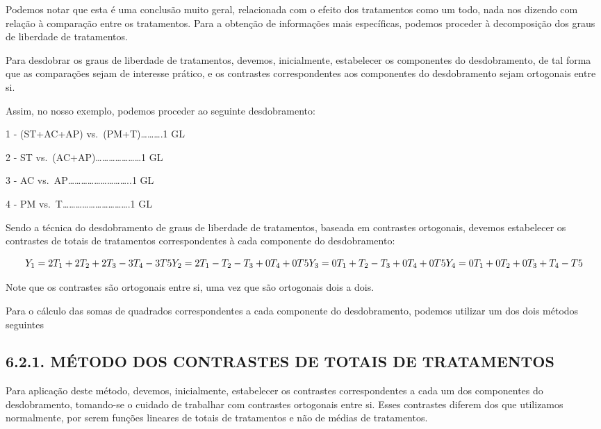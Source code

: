 \documentclass[
]{book}
\begin{document}
Podemos notar que esta é uma conclusão muito geral, relacionada com o efeito dos tratamentos como um todo, nada nos dizendo com relação à comparação entre os tratamentos. Para a obtenção de informações mais específicas, podemos proceder à decomposição dos graus de liberdade de tratamentos.

Para desdobrar os graus de liberdade de tratamentos, devemos, inicialmente, estabelecer os componentes do desdobramento, de tal forma que as comparações sejam de interesse prático, e os contrastes correspondentes aos componentes do desdobramento sejam ortogonais entre si.

Assim, no nosso exemplo, podemos proceder ao seguinte desdobramento:

1 - (ST+AC+AP) vs.~(PM+T)\ldots\ldots\ldots.1 GL

2 - ST vs.~(AC+AP)\ldots\ldots\ldots\ldots\ldots\ldots\ldots1 GL

3 - AC vs.~AP\ldots\ldots\ldots\ldots\ldots\ldots\ldots\ldots\ldots..1 GL

4 - PM vs.~T\ldots\ldots\ldots\ldots\ldots\ldots\ldots\ldots\ldots\ldots.1 GL

Sendo a técnica do desdobramento de graus de liberdade de tratamentos, baseada em contrastes ortogonais, devemos estabelecer os contrastes de totais de tratamentos correspondentes à cada componente do desdobramento:

\[
Y_1 = 2T_1+2T_2+2T_3-3T_4-3T5\\
Y_2 = 2T_1-T_2-T_3+0T_4+0T5\\
Y_3 = 0T_1+T_2-T_3+0T_4+0T5\\
Y_4 = 0T_1+0T_2+0T_3+T_4-T5
\]

Note que os contrastes são ortogonais entre si, uma vez que são ortogonais dois a dois.

Para o cálculo das somas de quadrados correspondentes a cada componente do desdobramento, podemos utilizar um dos dois métodos seguintes

\hypertarget{muxe9todo-dos-contrastes-de-totais-de-tratamentos}{%
\subsection{6.2.1. MÉTODO DOS CONTRASTES DE TOTAIS DE TRATAMENTOS}\label{muxe9todo-dos-contrastes-de-totais-de-tratamentos}}

Para aplicação deste método, devemos, inicialmente, estabelecer os contrastes correspondentes a cada um dos componentes do desdobramento, tomando-se o cuidado de trabalhar com contrastes ortogonais entre si. Esses contrastes diferem dos que utilizamos normalmente, por serem funções lineares de totais de tratamentos e não de médias de tratamentos.
\end{document}
